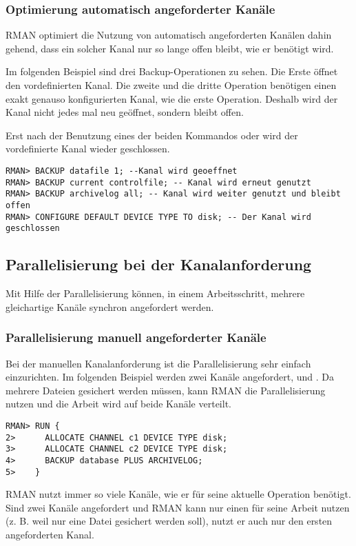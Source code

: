 
        \subsubsection{Optimierung automatisch angeforderter Kanäle}
          RMAN optimiert die Nutzung von automatisch angeforderten Kanälen dahin gehend, dass ein solcher Kanal nur so lange offen bleibt, wie er benötigt wird.

          Im folgenden Beispiel sind drei Backup-Operationen zu sehen. Die Erste öffnet den vordefinierten Kanal. Die zweite und die dritte Operation benötigen einen exakt genauso konfigurierten Kanal, wie die erste Operation. Deshalb wird der Kanal nicht jedes mal neu geöffnet, sondern bleibt offen.

          \begin{merke}
            Erst nach der Benutzung eines der beiden Kommandos  oder  wird der vordefinierte Kanal wieder geschlossen.
          \end{merke}
          \begin{lstlisting}[caption={Optimierung der automatischen Kanalanforderung},label=admin1017,language=rman]
RMAN> BACKUP datafile 1; --Kanal wird geoeffnet
RMAN> BACKUP current controlfile; -- Kanal wird erneut genutzt
RMAN> BACKUP archivelog all; -- Kanal wird weiter genutzt und bleibt offen
RMAN> CONFIGURE DEFAULT DEVICE TYPE TO disk; -- Der Kanal wird geschlossen
          \end{lstlisting}
      \subsection{Parallelisierung bei der Kanalanforderung}
        Mit Hilfe der Parallelisierung können, in einem Arbeitsschritt, mehrere gleichartige Kanäle synchron angefordert werden.
        \subsubsection{Parallelisierung manuell angeforderter Kanäle}
          Bei der manuellen Kanalanforderung ist die Parallelisierung sehr einfach einzurichten. Im folgenden Beispiel werden zwei Kanäle angefordert,  und . Da  mehrere Dateien gesichert werden müssen, kann RMAN die Parallelisierung nutzen und die Arbeit wird auf beide Kanäle verteilt.
\clearpage
          \begin{lstlisting}[caption={Parallelisierung und die manuelle Kanalanforderung},label=admin1018,language=rman]
RMAN> RUN {
2>      ALLOCATE CHANNEL c1 DEVICE TYPE disk;
3>      ALLOCATE CHANNEL c2 DEVICE TYPE disk;
4>      BACKUP database PLUS ARCHIVELOG;
5>    }
          \end{lstlisting}
          \begin{merke}
            RMAN nutzt immer so viele Kanäle, wie er für seine aktuelle Operation benötigt. Sind zwei Kanäle angefordert und RMAN kann nur einen für seine Arbeit nutzen (z. B. weil nur eine Datei gesichert werden soll), nutzt er auch nur den ersten angeforderten Kanal.
          \end{merke}
